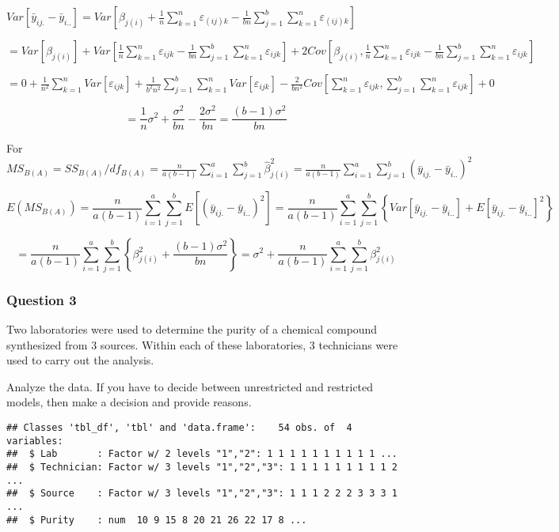 \documentclass[12pt,]{article}
\begin{document}
\(Var[\bar y_{ij.}-\bar y_{i..}]=Var[\beta_{j(i)}+\frac1{n}\sum_{k=1}^n\varepsilon_{(ij)k}-\frac1{bn}\sum_{j=1}^b\sum_{k=1}^n\varepsilon_{(ij)k}]\)

\(=Var[\beta_{j(i)}]+Var[\frac1{n}\sum_{k=1}^n\varepsilon_{ijk}-\frac1{bn}\sum_{j=1}^b\sum_{k=1}^n\varepsilon_{ijk}]+2Cov[\beta_{j(i)},\frac1{n}\sum_{k=1}^n\varepsilon_{ijk}-\frac1{bn}\sum_{j=1}^b\sum_{k=1}^n\varepsilon_{ijk}]\)

\(=0+\frac1{n^2}\sum_{k=1}^nVar[\varepsilon_{ijk}]+\frac{1}{b^2n^2}\sum_{j=1}^b\sum_{k=1}^nVar[\varepsilon_{ijk}]-\frac{2}{bn^2}Cov[\sum_{k=1}^n\varepsilon_{ijk},\sum_{j=1}^b\sum_{k=1}^n\varepsilon_{ijk}]+0\)

\[=\frac1n\sigma^2+\frac{\sigma^2}{bn}-\frac{2\sigma^2}{bn}=\frac{(b-1)\sigma^2}{bn}\]

For
\(MS_{B(A)}=SS_{B(A)}/df_{B(A)}=\frac{n}{a(b-1)}\sum_{i=1}^a\sum_{j=1}^b\hat\beta_{j(i)}^2=\frac{n}{a(b-1)}\sum_{i=1}^a\sum_{j=1}^b(\bar y_{ij.}-\bar y_{i..})^2\)

\[E(MS_{B(A)})=\frac{n}{a(b-1)}\sum_{i=1}^a\sum_{j=1}^bE[(\bar y_{ij.}-\bar y_{i..})^2]=\frac{n}{a(b-1)}\sum_{i=1}^a\sum_{j=1}^b\left\{Var[\bar y_{ij.}-\bar y_{i..}]+E[\bar y_{ij.}-\bar y_{i..}]^2\right\}\]

\[=\frac{n}{a(b-1)}\sum_{i=1}^a\sum_{j=1}^b\left\{\beta_{j(i)}^2+\frac{(b-1)\sigma^2}{bn}\right\}=\sigma^2+\frac{n}{a(b-1)}\sum_{i=1}^a\sum_{j=1}^b\beta_{j(i)}^2\]

\hypertarget{question-3}{%
\subsubsection{Question 3}\label{question-3}}

\textcolor[rgb]{0.7,0.7,0.7}{Two laboratories were used to determine the purity of a chemical compound synthesized from 3 sources. Within each of these laboratories, 3 technicians were used to carry out the analysis.
}

\textcolor[rgb]{0.7,0.7,0.7}{Analyze the data. If you have to decide between unrestricted and restricted models, then make a decision and provide reasons.}

\begin{verbatim}
## Classes 'tbl_df', 'tbl' and 'data.frame':    54 obs. of  4 variables:
##  $ Lab       : Factor w/ 2 levels "1","2": 1 1 1 1 1 1 1 1 1 1 ...
##  $ Technician: Factor w/ 3 levels "1","2","3": 1 1 1 1 1 1 1 1 1 2 ...
##  $ Source    : Factor w/ 3 levels "1","2","3": 1 1 1 2 2 2 3 3 3 1 ...
##  $ Purity    : num  10 9 15 8 20 21 26 22 17 8 ...
\end{verbatim}
\end{document}
